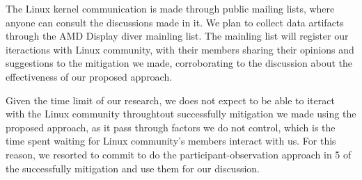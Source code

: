 The Linux kernel communication is made through public mailing lists, where anyone can consult the discussions made in it.
We plan to collect data artifacts through the AMD Display diver mainling list.
The mainling list will register our iteractions with Linux community, with 
their members sharing their opinions and suggestions to the mitigation we made, corroborating to the discussion about the 
effectiveness of our proposed approach.

Given the time limit of our research, we does not expect to be able to iteract with the Linux community throughtout successfully
mitigation we made using the proposed approach, as it pass through factors we do not control, which is the time spent waiting 
for Linux community's members interact with us.
For this reason, we resorted to commit to do the participant-observation approach 
in 5 of the successfully mitigation and use them for our discussion. 





